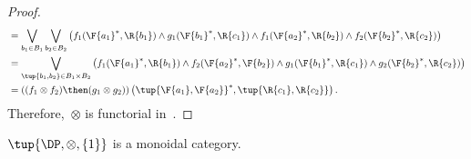 \begin{proof}
\begin{equation}
\begin{aligned}
      &=\bigvee_{b_1\in B_1}\bigvee_{b_2\in B_2} \left(f_1(\F{a_1}^*,\R{b_1})\wedge g_1(\F{b_1}^*,\R{c_1})\wedge f_1(\F{a_2}^*,\R{b_2})\wedge f_2(\F{b_2}^*,\R{c_2}) \right)\\
      &=\bigvee_{\tup{b_1,b_2}\in B_1\times B_2} \left(f_1(\F{a_1}^*,\R{b_1})\wedge f_2(\F{a_2}^*,\F{b_2})\wedge g_1(\F{b_1}^*,\R{c_1})\wedge g_2(\F{b_2}^*,\R{c_2}) \right)\\
      &=\left( (f_1\otimes f_2)\then (g_1\otimes g_2)\right)\left(\tup{\F{a_1},\F{a_2}}^*,\tup{\R{c_1},\R{c_2}} \right).
    \end{aligned}
  \end{equation}
  Therefore,~$\otimes$ is functorial in~\DP.
\end{proof}


\begin{lemma}
  $\tup{\DP,\otimes, \{1\}}$ is a monoidal category.
\end{lemma}
